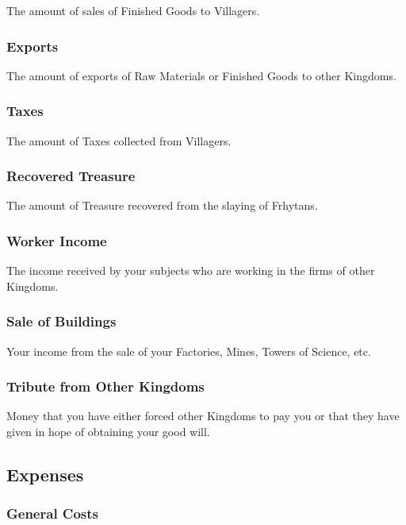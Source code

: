 The amount of sales of Finished Goods to Villagers.

\subsubsection{\textsf{Exports}}

The amount of exports of Raw Materials or Finished Goods to other Kingdoms.

\subsubsection{\textsf{Taxes}}

The amount of Taxes collected from Villagers.

\subsubsection{\textsf{Recovered Treasure}}

The amount of Treasure recovered from the slaying of Frhytans.

\subsubsection{\textsf{Worker Income}}

The income received by your subjects who are working in the firms of other Kingdoms.

\subsubsection{\textsf{Sale of Buildings}}

Your income from the sale of your Factories, Mines, Towers of Science, etc.

\subsubsection{\textsf{Tribute from Other Kingdoms}}

Money that you have either forced other Kingdoms to pay you or that they have given in hope of obtaining your good will.

\subsection{\textsf{Expenses}}


\subsubsection{\textsf{General Costs}}

